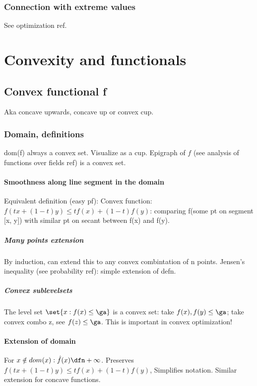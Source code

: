 \documentclass[oneside, article]{memoir}
\begin{document}
\subsection{Connection with extreme values}
See optimization ref.

\chapter{Convexity and functionals}
\section{Convex functional f}
Aka concave upwards, concave up or convex cup.

\subsection{Domain, definitions}
dom(f) always a convex set. Visualize as a cup. Epigraph of $f$ (see analysis of functions over fields ref) is a convex set.


\subsubsection{Smoothness along line segment in the domain}
Equivalent definition (easy pf): Convex function: $f(tx + (1-t)y) \leq tf(x) + (1-t)f(y)$: comparing f(some pt on segment [x, y]) with similar pt on secant between f(x) and f(y).

\paragraph*{Many points extension}
By induction, can extend this to any convex combintation of n points. Jensen's inequality (see probability ref): simple extension of defn.

\paragraph*{Convex sublevelsets}
The level set $\set{x: f(x) \leq \ga}$ is a convex set: take $f(x), f(y) \leq \ga$; take convex combo z, see $f(z) \leq \ga$. This is important in convex optimization!


\subsubsection{Extension of domain}
For $x \notin dom(x): \hat{f}(x) \dfn +\infty$. Preserves $f(tx + (1-t)y) \leq tf(x) + (1-t)f(y)$, Simplifies notation. Similar extension for concave functions.
\end{document}
